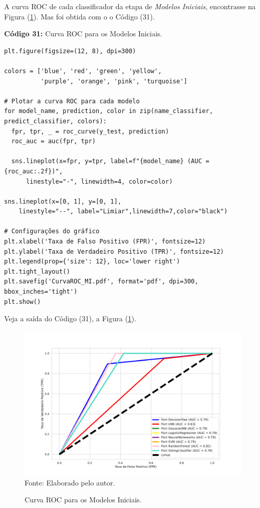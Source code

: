 \documentclass[a4paper,12pt]{article} %
\begin{document}
 A curva ROC de cada classificador da etapa de \textit{Modelos Iniciais}, encontrasse na Figura (\ref{fig:7}). Mas foi obtida com o o Código (31).
\begin{center}
\textbf{Código 31:} Curva ROC para os Modelos Iniciais.
\begin{verbatim}
plt.figure(figsize=(12, 8), dpi=300)

colors = ['blue', 'red', 'green', 'yellow',
          'purple', 'orange', 'pink', 'turquoise']

# Plotar a curva ROC para cada modelo
for model_name, prediction, color in zip(name_classifier, predict_classifier, colors):
  fpr, tpr, _ = roc_curve(y_test, prediction)
  roc_auc = auc(fpr, tpr)

  sns.lineplot(x=fpr, y=tpr, label=f"{model_name} (AUC = {roc_auc:.2f})",
      linestyle="-", linewidth=4, color=color)

sns.lineplot(x=[0, 1], y=[0, 1],
    linestyle="--", label="Limiar",linewidth=7,color="black")

# Configurações do gráfico
plt.xlabel('Taxa de Falso Positivo (FPR)', fontsize=12)
plt.ylabel('Taxa de Verdadeiro Positivo (TPR)', fontsize=12)
plt.legend(prop={'size': 12}, loc='lower right')
plt.tight_layout()
plt.savefig('CurvaROC_MI.pdf', format='pdf', dpi=300, bbox_inches='tight')
plt.show()
\end{verbatim}
\end{center}

Veja a saída do Código (31), a Figura (\ref{fig:7}).
 \begin{figure}[H]
     \centering
     \caption{Curva ROC para os Modelos Iniciais.}
     \includegraphics[scale=0.6]{Figures/CurvaROC_MI.pdf}
     \label{fig:7}
     Fonte: Elaborado pelo autor.
 \end{figure}
\end{document}
